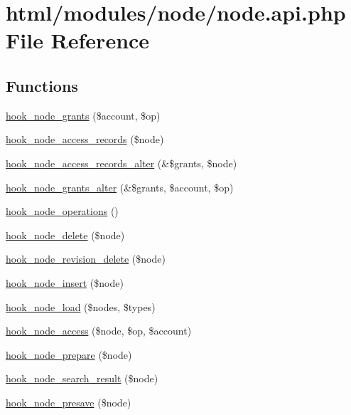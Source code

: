 \hypertarget{node_8api_8php}{
\section{html/modules/node/node.api.php File Reference}
\label{node_8api_8php}
}
\subsection*{Functions}
\begin{DoxyCompactItemize}
\item 
\hyperlink{group__node__access_gaa973f2ab6ab14c3fa14e5138c6d69ecf}{hook\_\-node\_\-grants} (\$account, \$op)
\item 
\hyperlink{group__node__access_ga3fe7744d74446e40e9b9ad2a782b4269}{hook\_\-node\_\-access\_\-records} (\$node)
\item 
\hyperlink{group__node__access_ga37c90bf0e1dccad0deefa368dd94cc83}{hook\_\-node\_\-access\_\-records\_\-alter} (\&\$grants, \$node)
\item 
\hyperlink{group__node__access_ga21e95e2bd0b4ed12d861aa83426a8ba3}{hook\_\-node\_\-grants\_\-alter} (\&\$grants, \$account, \$op)
\item 
\hyperlink{group__hooks_gadedee7943c08aeed54ea520c34471a28}{hook\_\-node\_\-operations} ()
\item 
\hyperlink{group__node__api__hooks_ga66ea0473a9950dc961802e801e5042e9}{hook\_\-node\_\-delete} (\$node)
\item 
\hyperlink{group__node__api__hooks_gad7e8c6941181366016058771ae841bc9}{hook\_\-node\_\-revision\_\-delete} (\$node)
\item 
\hyperlink{group__node__api__hooks_ga8b40dc62e46e5055c205d2a723dc3548}{hook\_\-node\_\-insert} (\$node)
\item 
\hyperlink{group__node__api__hooks_gad48bb14b68ed38526029d1f7ac2d2de4}{hook\_\-node\_\-load} (\$nodes, \$types)
\item 
\hyperlink{group__node__access_ga75a280ea1fbe0fb6ca034f8aad06d58d}{hook\_\-node\_\-access} (\$node, \$op, \$account)
\item 
\hyperlink{group__node__api__hooks_ga4bbe7320bd52fc6183920c8be2d9d4f6}{hook\_\-node\_\-prepare} (\$node)
\item 
\hyperlink{group__node__api__hooks_ga8644320a0e04e3a503c99626d4223725}{hook\_\-node\_\-search\_\-result} (\$node)
\item 
\hyperlink{group__node__api__hooks_gab339b1a1ce0e235d4a9c5a05e410dcd6}{hook\_\-node\_\-presave} (\$node)

\end{DoxyCompactItemize}
